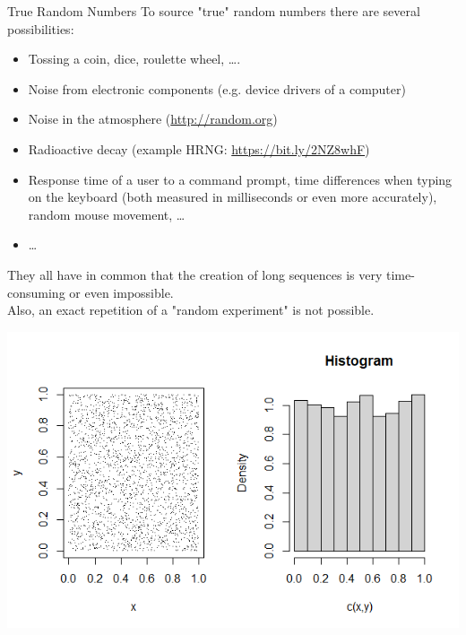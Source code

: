 \documentclass[11pt,compress,t,notes=noshow, xcolor=table]{beamer}
\begin{document}
\begin{vbframe}{True Random Numbers}
To source "true" random numbers there are several possibilities:
\begin{itemize}
  \item Tossing a coin, dice, roulette wheel, \ldots.
  \item Noise from electronic components (e.g. device drivers of a computer)
  \item Noise in the atmosphere (\url{http://random.org})
  \item Radioactive decay (example HRNG: \url{https://bit.ly/2NZ8whF})
  \item Response time of a user to a command prompt, time differences when typing on the keyboard (both measured in milliseconds or even more accurately),
    random mouse movement, \ldots
  \item \ldots
\end{itemize}
They all have in common that the creation of long sequences is very time-consuming or even impossible.\\
\medskip
Also, an exact repetition of a "random experiment" is not possible.

\framebreak

\begin{center}
\includegraphics[width =1\textwidth]{figure_man/random.png}
\end{center}


\end{vbframe}
\end{document}
